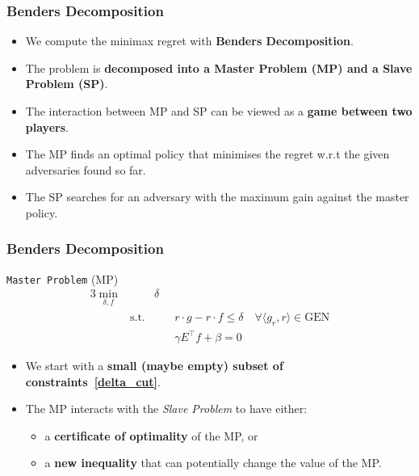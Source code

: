 \documentclass{beamer}
\begin{document}
\begin{frame}
\frametitle{Benders Decomposition}

\begin{itemize}
\item We compute the minimax regret with \textbf{Benders Decomposition}.
\item The problem is \textbf{decomposed into a Master Problem (MP) and a Slave Problem (SP)}.
\item The interaction between MP and SP can be viewed as a \textbf{game between two players}. 
\item The MP finds an optimal policy that minimises the regret  w.r.t the given adversaries found so far.
\item The SP searches for an adversary with the maximum gain against the master policy. 
\end{itemize}

\end{frame}

\begin{frame}
\frametitle{Benders Decomposition}
\begin{block}{\texttt{Master Problem} (MP)}
\begin{alignat}{3}
\min_{\delta, f} && \delta & \\
&\text{s.t.}&& r\cdot g - r \cdot f \leq \delta \quad \forall \langle g_r, r \rangle \in \text{GEN}\label{delta_cut}\\
&& \quad& \gamma E^{\top} f + \beta = 0 
\end{alignat}
\end{block}
\begin{itemize}
\item We start with a \textbf{small (maybe empty) subset of constraints~\eqref{delta_cut}}.
\item The MP interacts with the \emph{Slave Problem} to have either:
\begin{itemize}
\item  a \textbf{certificate of optimality} of the MP, or
\item  a \textbf{new inequality} that can potentially change the value of the MP.
\end{itemize}
\end{itemize}
\end{frame}
\end{document}
